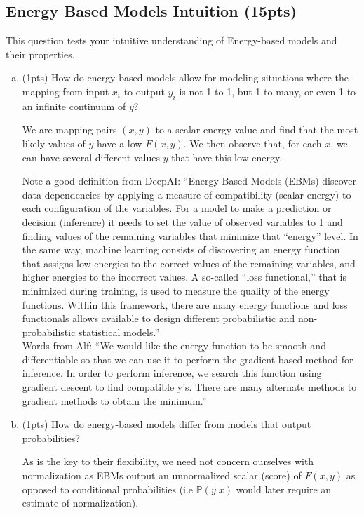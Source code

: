 \documentclass{article}
\begin{document}
\subsection{Energy Based Models Intuition (15pts) }
This question tests your intuitive understanding of Energy-based models and their properties. 
\begin{enumerate}[(a)]

\item (1pts) How do energy-based models allow for modeling situations where the mapping from input $x_i$ to output $y_i$ is not 1 to 1, but 1 to many, or even 1 to an infinite continuum of $y$?
\begin{tcolorbox}
    We are mapping pairs $(x,y)$ to a scalar energy value
	and find that the most likely values of $y$ have a low
	$F(x,y)$. We then observe that, for each $x$, we can have several different
	values $y$ that have this low energy.

    Note a good definition from DeepAI: ``Energy-Based
		      Models (EBMs) discover data dependencies by applying a
		      measure of
		      compatibility (scalar energy) to each configuration of
		      the variables. For a model to make a prediction or
		      decision (inference)
		      it needs to set the value of observed variables to 1
		      and finding values of the remaining variables that
		      minimize that “energy”
		      level.
		      In the same way, machine learning consists of
		      discovering an energy function that assigns low energies
		      to the correct values
		      of the remaining variables,
		      and higher energies to the incorrect values. A
		      so-called “loss functional,” that is minimized during
		      training, is used to
		      measure the quality of the energy functions. Within this
		      framework, there are
		      many energy functions and loss functionals allows
		      available to design different
		      probabilistic and non-probabilistic statistical
		      models.''\\
		      Words from Alf: ``We would like the energy function to
		      be smooth and differentiable so that we can use it to
		      perform the
		      gradient-based method for inference. In order to perform
		      inference, we search
		      this function using gradient descent to find compatible
		      y's. There are many
		      alternate methods to gradient methods to obtain the
		      minimum.''
\end{tcolorbox}

\item (1pts) How do energy-based models differ from models that output probabilities?
\begin{tcolorbox}
    As is the key to their flexibility, we need not concern
		      ourselves
		      with normalization as EBMs output an unnormalized scalar
		      (score) of $F(x,y)$ as
		      opposed to conditional probabilities (i.e
		      $\mathbb{P}(y|x)$ would later require
		      an estimate of normalization).
\end{tcolorbox}


\end{enumerate}
\end{document}
